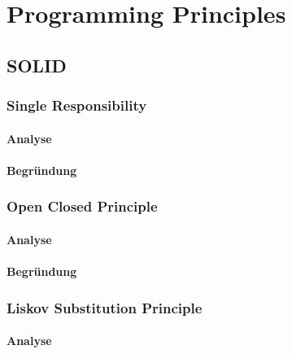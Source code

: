 
\chapter{Programming Principles}

\section{SOLID}

	\subsection{Single Responsibility}

		\subsubsection{Analyse}

		\subsubsection{Begründung}

	\subsection{Open Closed Principle}
	
		\subsubsection{Analyse}

		\subsubsection{Begründung}

	\subsection{Liskov Substitution Principle}

		\subsubsection{Analyse}

